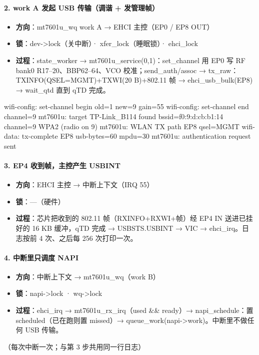 \paragraph*{2. work A 发起 USB 传输（调谐 + 发管理帧）}
\begin{itemize}[leftmargin=2em,itemsep=1pt]
\item \textbf{方向}：mt7601u\_wq work A → EHCI 主控（EP0 / EP8 OUT）
\item \textbf{锁}：dev->lock（关中断）· xfer\_lock（睡眠锁）· ehci\_lock
\item \textbf{过程}：state\_worker → mt7601u\_service(0,1)：set\_channel 用 EP0 写 RF bank0 R17–20、BBP62–64、VCO 校准；send\_auth/assoc → tx\_raw：TXINFO(QSEL=MGMT)+TXWI(20 B)+802.11 帧 → ehci\_usb\_bulk(EP8) → wait\_qtd 直到 qTD 完成。
\end{itemize}
\begin{dbglog}
wifi-config: set-channel begin old=1 new=9 gain=55
wifi-config: set-channel end channel=9
mt7601u: target TP-Link_B114 found bssid=f0:9:d:cb:b1:14 channel=9 WPA2 (radio on 9)
mt7601u: WLAN TX path EP8 qsel=MGMT
wifi-data: tx-complete EP8 usb-bytes=60 mpdu=30
mt7601u: authentication request sent
\end{dbglog}

\paragraph*{3. EP4 收到帧，主控产生 USBINT}
\begin{itemize}[leftmargin=2em,itemsep=1pt]
\item \textbf{方向}：EHCI 主控 → 中断上下文（IRQ 55）
\item \textbf{锁}：—（硬件）
\item \textbf{过程}：芯片把收到的 802.11 帧（RXINFO+RXWI+帧）经 EP4 IN 送进已挂好的 16 KB 缓冲，qTD 完成 → USBSTS.USBINT → VIC → ehci\_irq。日志按前 4 次、之后每 256 次打印一次。
\end{itemize}

\paragraph*{4. 中断里只调度 NAPI}
\begin{itemize}[leftmargin=2em,itemsep=1pt]
\item \textbf{方向}：中断上下文 → mt7601u\_wq（work B）
\item \textbf{锁}：napi->lock · wq->lock
\item \textbf{过程}：ehci\_irq → mt7601u\_rx\_irq（used \&\& ready）→ napi\_schedule：置 scheduled（已在跑则置 missed）→ queue\_work(napi->work)。中断里不做任何 USB 传输。
\end{itemize}
\begin{dbglog}
（每次中断一次；与第 3 步共用同一行日志）
\end{dbglog}

